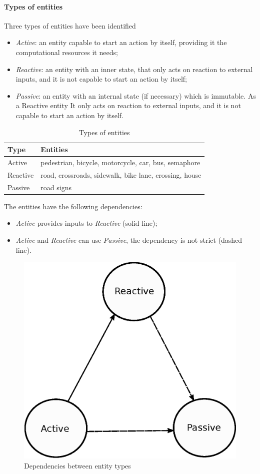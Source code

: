 \paragraph{Types of entities}
Three types of entities have been identified
\begin{itemize}
  \item \textit{Active}: an entity capable to start an action by itself, 
  providing it the computational resources it needs;
  \item \textit{Reactive}: an entity with an inner state, that only acts on reaction to external inputs, 
  and it is not capable to start an action by itself;
  \item \textit{Passive}: an entity with an internal state (if necessary) which is immutable. 
   As a Reactive entity It only acts on reaction to external inputs, and it is not capable to start an action by itself.
\end{itemize}
\begin{table}[H]
\centering
\begin{tabular}{|l|l|}
\hline
\rowcolor{BlueGreen}
Type     & Entities                                 \\ \hline
Active   & pedestrian, bicycle, motorcycle, car, bus, semaphore \\ \hline
Reactive & road, crossroads, sidewalk, bike lane, crossing, house \\ \hline
Passive  & road signs                               \\ \hline
\end{tabular}
\caption{Types of entities}
\label{tab:entity_type}
\end{table}
The entities have the following dependencies:
\begin{itemize}
  \item \textit{Active} provides inputs to \textit{Reactive} (solid line);
  \item \textit{Active} and \textit{Reactive} can use \textit{Passive}, the dependency is not strict (dashed line).
\end{itemize}
\begin{figure}[H]
  \centering
  \includegraphics[width=.35\columnwidth]{sections/images/solution/entity_type_dependency.eps}
  \caption{Dependencies between entity types}
  \label{fig:sd-entity-types-deps}
\end{figure}
